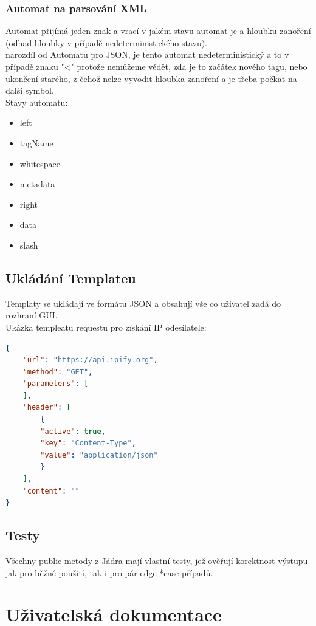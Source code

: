 \documentclass[a4paper]{article}
\begin{document}
        \subsubsection{Automat na parsování XML}
            Automat přijímá jeden znak a vrací v jakém stavu automat je a hloubku zanoření
            (odhad hloubky v případě nedeterministického stavu).\\
            narozdíl od Automatu pro JSON, je tento automat nedeterministický 
            a to v případě znaku "<" protože nemůžeme vědět, zda je to začátek
            nového tagu, nebo ukončení starého, z čehož nelze vyvodit hloubka zanoření a 
            je třeba počkat na další symbol.\\
            Stavy automatu:
            \begin{itemize}
                \item left
                \item tagName
                \item whitespace
                \item metadata
                \item right
                \item data
                \item slash
            \end{itemize}			
    \subsection{Ukládání Templateu}
        Templaty se ukládají ve formátu JSON a obsahují vše co uživatel zadá do rozhraní GUI.\\
        Ukázka templeatu requestu pro získání IP odesílatele:
        \begin{lstlisting}[language=json,numbers=none,frame=none]
{
    "url": "https://api.ipify.org",
    "method": "GET",
    "parameters": [
    ],
    "header": [
        {
        "active": true,
        "key": "Content-Type",
        "value": "application/json"
        }
    ],
    "content": ""
}            
            \end{lstlisting}
    \subsection{Testy}
        Všechny public metody z Jádra mají vlastní testy, jež ověřují 
        korektnost výstupu jak pro běžné použití, tak i pro pár edge-*case případů.
\section{Uživatelská dokumentace}
\end{document}
